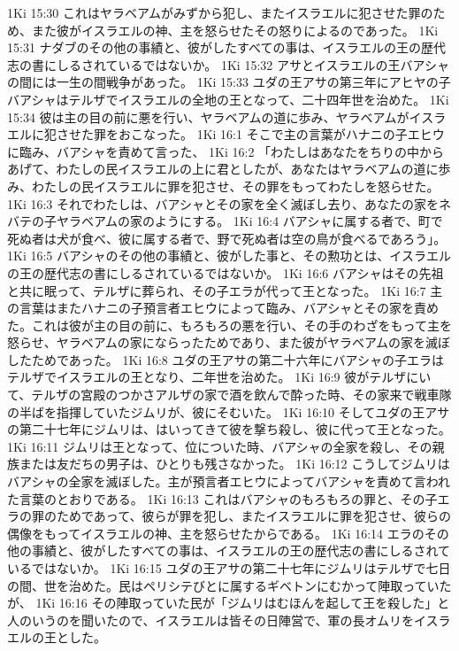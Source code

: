 1Ki 15:30  これはヤラベアムがみずから犯し、またイスラエルに犯させた罪のため、また彼がイスラエルの神、主を怒らせたその怒りによるのであった。
1Ki 15:31  ナダブのその他の事績と、彼がしたすべての事は、イスラエルの王の歴代志の書にしるされているではないか。
1Ki 15:32  アサとイスラエルの王バアシャの間には一生の間戦争があった。
1Ki 15:33  ユダの王アサの第三年にアヒヤの子バアシャはテルザでイスラエルの全地の王となって、二十四年世を治めた。
1Ki 15:34  彼は主の目の前に悪を行い、ヤラベアムの道に歩み、ヤラベアムがイスラエルに犯させた罪をおこなった。
1Ki 16:1  そこで主の言葉がハナニの子エヒウに臨み、バアシャを責めて言った、
1Ki 16:2  「わたしはあなたをちりの中からあげて、わたしの民イスラエルの上に君としたが、あなたはヤラベアムの道に歩み、わたしの民イスラエルに罪を犯させ、その罪をもってわたしを怒らせた。
1Ki 16:3  それでわたしは、バアシャとその家を全く滅ぼし去り、あなたの家をネバテの子ヤラベアムの家のようにする。
1Ki 16:4  バアシャに属する者で、町で死ぬ者は犬が食べ、彼に属する者で、野で死ぬ者は空の鳥が食べるであろう」。
1Ki 16:5  バアシャのその他の事績と、彼がした事と、その勲功とは、イスラエルの王の歴代志の書にしるされているではないか。
1Ki 16:6  バアシャはその先祖と共に眠って、テルザに葬られ、その子エラが代って王となった。
1Ki 16:7  主の言葉はまたハナニの子預言者エヒウによって臨み、バアシャとその家を責めた。これは彼が主の目の前に、もろもろの悪を行い、その手のわざをもって主を怒らせ、ヤラベアムの家にならったためであり、また彼がヤラベアムの家を滅ぼしたためであった。
1Ki 16:8  ユダの王アサの第二十六年にバアシャの子エラはテルザでイスラエルの王となり、二年世を治めた。
1Ki 16:9  彼がテルザにいて、テルザの宮殿のつかさアルザの家で酒を飲んで酔った時、その家来で戦車隊の半ばを指揮していたジムリが、彼にそむいた。
1Ki 16:10  そしてユダの王アサの第二十七年にジムリは、はいってきて彼を撃ち殺し、彼に代って王となった。
1Ki 16:11  ジムリは王となって、位についた時、バアシャの全家を殺し、その親族または友だちの男子は、ひとりも残さなかった。
1Ki 16:12  こうしてジムリはバアシャの全家を滅ぼした。主が預言者エヒウによってバアシャを責めて言われた言葉のとおりである。
1Ki 16:13  これはバアシャのもろもろの罪と、その子エラの罪のためであって、彼らが罪を犯し、またイスラエルに罪を犯させ、彼らの偶像をもってイスラエルの神、主を怒らせたからである。
1Ki 16:14  エラのその他の事績と、彼がしたすべての事は、イスラエルの王の歴代志の書にしるされているではないか。
1Ki 16:15  ユダの王アサの第二十七年にジムリはテルザで七日の間、世を治めた。民はペリシテびとに属するギベトンにむかって陣取っていたが、
1Ki 16:16  その陣取っていた民が「ジムリはむほんを起して王を殺した」と人のいうのを聞いたので、イスラエルは皆その日陣営で、軍の長オムリをイスラエルの王とした。
